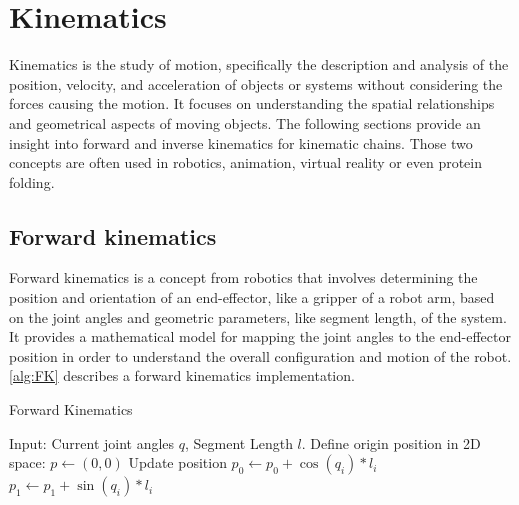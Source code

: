 % 

% 

\section{Kinematics}

Kinematics is the study of motion, specifically the description and analysis of the position, velocity, and acceleration of objects or systems \cite{ForwardKinematics} \cite{CCD} without considering the forces causing the motion. It focuses on understanding the spatial relationships and geometrical aspects of moving objects. The following sections provide an insight into forward and inverse kinematics for kinematic chains. Those two concepts are often used in robotics, animation, virtual reality or even protein folding. 

\subsection{Forward kinematics}

Forward kinematics is a concept from robotics that involves determining the position and orientation of an end-effector, like a gripper of a robot arm, based on the joint angles and geometric parameters, like segment length, of the system. It provides a mathematical model for mapping the joint angles to the end-effector position in order to understand the overall configuration and motion of the robot. \eqref{alg:FK} describes a forward kinematics implementation. 
% 

\begin{algorithm}
    \caption{Forward Kinematics}\label{alg:FK}
    \begin{algorithmic}
        \State{} Input: Current joint angles $q$, Segment Length $l$.
        \State{} Define origin position in 2D space: $p \leftarrow (0, 0)$
            \State{} Update position
            \State{} $p_0 \leftarrow p_0 + \cos(q_i) * l_i$
            \State{} $p_1 \leftarrow p_1 + \sin(q_i) * l_i$
        \EndFor{}
\end{algorithmic}
\end{algorithm}

